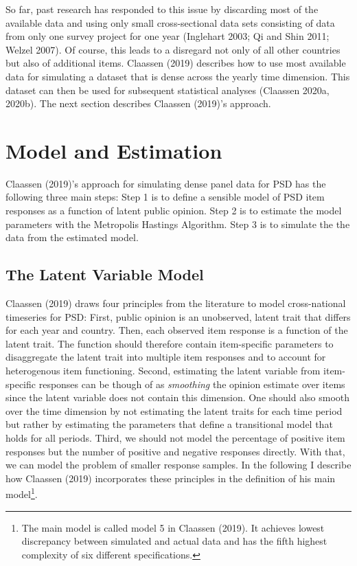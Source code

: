 \documentclass[12pt,english,a4paper,oneside]{article}
\theoremstyle{definition}
\theoremstyle{definition}
\theoremstyle{definition}
\theoremstyle{definition}
\theoremstyle{remark}
\begin{document}
So far, past research has responded to this issue by discarding most of the available data and using only small cross-sectional data sets consisting of data from only one survey project for one year (Inglehart 2003; Qi and Shin 2011; Welzel 2007). Of course, this leads to a disregard not only of all other countries but also of additional items. Claassen (2019) describes how to use most available data for simulating a dataset that is dense across the yearly time dimension. This dataset can then be used for subsequent statistical analyses (Claassen 2020a, 2020b). The next section describes Claassen (2019)'s approach.

\hypertarget{model-and-estimation}{%
\section{Model and Estimation}\label{model-and-estimation}}

Claassen (2019)'s approach for simulating dense panel data for PSD has the following three main steps: Step 1 is to define a sensible model of PSD item responses as a function of latent public opinion. Step 2 is to estimate the model parameters with the Metropolis Hastings Algorithm. Step 3 is to simulate the the data from the estimated model.

\hypertarget{the-latent-variable-model}{%
\subsection{The Latent Variable Model}\label{the-latent-variable-model}}

Claassen (2019) draws four principles from the literature to model cross-national timeseries for PSD: First, public opinion is an unobserved, latent trait that differs for each year and country. Then, each observed item response is a function of the latent trait. The function should therefore contain item-specific parameters to disaggregate the latent trait into multiple item responses and to account for heterogenous item functioning. Second, estimating the latent variable from item-specific responses can be though of as \emph{smoothing} the opinion estimate over items since the latent variable does not contain this dimension. One should also smooth over the time dimension by not estimating the latent traits for each time period but rather by estimating the parameters that define a transitional model that holds for all periods. Third, we should not model the percentage of positive item responses but the number of positive and negative responses directly. With that, we can model the problem of smaller response samples. In the following I describe how Claassen (2019) incorporates these principles in the definition of his main model\footnote{The main model is called model 5 in Claassen (2019). It achieves lowest discrepancy between simulated and actual data and has the fifth highest complexity of six different specifications.}.\newline
\end{document}
